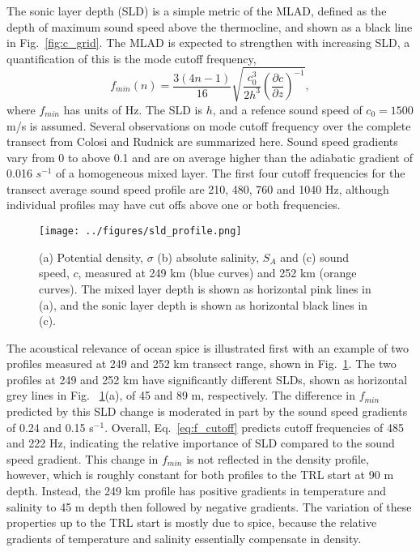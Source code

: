 \documentclass[preprint,NumberedRefs]{JASA}
\begin{document}
The sonic layer depth (SLD) is a simple metric of the MLAD, defined as the depth of maximum sound speed above the thermocline, and shown as a black line in Fig.~\ref{fig:c_grid}. The MLAD is expected to strengthen with increasing SLD, a quantification of this is the mode cutoff frequency\citep{Urick1982Prop},
\begin{equation}
    f_{min}(n) = \frac{3(4n-1)}{16} \sqrt{\frac{c_0^3}{2h^3} \left( \frac{\partial c}{\partial z} \right) ^ {-1}},
    \label{eq:f_cutoff}
\end{equation}
where $f_{min}$ has units of Hz. The SLD is $h$, and a refence sound speed of $c_0 = 1500$ m/s is assumed. Several observations on mode cutoff frequency over the complete transect from Colosi and Rudnick\cite{colosi2020observations} are summarized here. Sound speed gradients vary from 0 to above 0.1 and are on average higher than the adiabatic gradient of 0.016 $s^{-1}$ of a homogeneous mixed layer. The first four cutoff frequencies for the transect average sound speed profile are 210, 480, 760 and 1040 Hz, although individual profiles may have cut offs above one or both frequencies.

\begin{figure}
    \texttt{[image: ../figures/sld\_profile.png]}
    \caption{\label{fig:profiles}{(a) Potential density, $\sigma$ (b) absolute salinity, $S_A$ and (c) sound speed, $c$, measured at 249 km (blue curves) and 252 km (orange curves). The mixed layer depth is shown as horizontal pink lines in (a), and the sonic layer depth is shown as horizontal black lines in (c).}}
\end{figure}

The acoustical relevance of ocean spice is illustrated first with an example of two profiles measured at 249 and 252 km transect range, shown in Fig.~\ref{fig:profiles}. The two profiles at 249 and 252 km have significantly different SLDs, shown as horizontal grey lines in Fig. ~\ref{fig:profiles}(a), of 45 and 89 m, respectively. The difference in $f_{min}$ predicted by this SLD change is moderated in part by the sound speed gradients of 0.24 and 0.15 s$^{-1}$. Overall, Eq.~\eqref{eq:f_cutoff} predicts cutoff frequencies of 485 and 222 Hz, indicating the relative importance of SLD compared to the sound speed gradient. This change in $f_{min}$ is not reflected in the density profile, however, which is roughly constant for both profiles to the TRL start at 90 m depth. Instead, the 249 km profile has positive gradients in temperature and salinity to 45 m depth then followed by negative gradients. The variation of these properties up to the TRL start is mostly due to spice, because the relative gradients of temperature and salinity essentially compensate in density.
\end{document}
